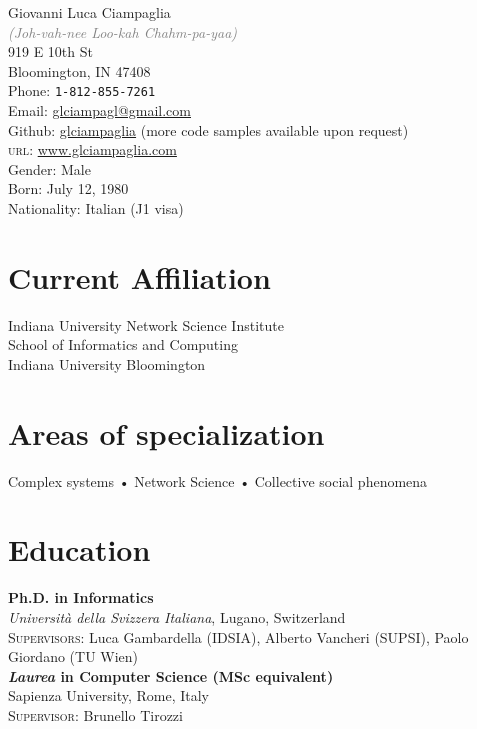 \documentclass[10pt, letterpaper]{article}
\newcommand{\years}[1]{\marginnote{\small #1}}
\begin{document}
{\LARGE Giovanni Luca Ciampaglia}\\
\textcolor{gray}{\emph{(Joh-vah-nee Loo-kah Chahm-pa-yaa)}}\\[1cm]
919 E 10th St \\
Bloomington, IN 47408\\[.2cm]
Phone: \texttt{1-812-855-7261}\\
Email: \href{mailto:gciampag@indiana.edu}{glciampagl@gmail.com}\\
Github: \href{http://github.com/glciampaglia}{glciampaglia} (more code samples available upon request)\\
\textsc{url}: \href{http://www.glciampaglia.com/}{www.glciampaglia.com}\\[.2cm]
Gender: Male\\
Born:  July 12, 1980\\
Nationality: Italian (J1 visa)

\section*{Current Affiliation}

Indiana University Network Science Institute\\
School of Informatics and Computing\\
Indiana University Bloomington

\section*{Areas of specialization}
Complex systems • Network Science • Collective social phenomena


\section*{Education}
\noindent

\years{2012}\textbf{Ph.D. in Informatics}\\
%
\textsl{Università della Svizzera Italiana}, Lugano, Switzerland\\
%
\textsc{Supervisors}: Luca Gambardella (IDSIA), Alberto Vancheri (SUPSI), Paolo
Giordano (TU Wien)\\[1em]

\years{2006}\textbf{\textsl{Laurea} in Computer Science (MSc equivalent)}\\ 
%
Sapienza University, Rome, Italy\\
%
\textsc{Supervisor}: Brunello Tirozzi \\[1em]
\end{document}
